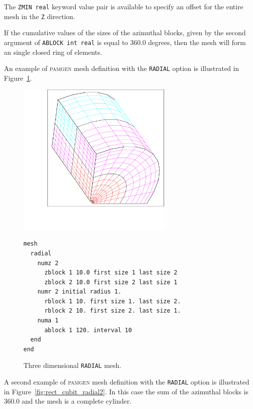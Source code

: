 The \texttt{ZMIN real} keyword value pair is available to specify an offset for the
entire mesh in the \texttt{Z} direction.

If the cumulative values of the sizes of the azimuthal blocks, given
by the second argument of \texttt{ABLOCK int real} is equal to 360.0 degrees, then the mesh
will form an single closed ring of elements.


An example of \textsc{pamgen} mesh definition with the
\texttt{RADIAL} option is illustrated in
Figure~\ref{fig:rect_cubit_radial}.

\begin{figure}[!thbp]
\centering
\hfil
  \begin{minipage}[c]{1.0\linewidth}
    \centering
\includegraphics[width=3.0in]{figures/cubit_radial1}
{\ttfamily \begin{verbatim}
mesh
  radial
    numz 2
      zblock 1 10.0 first size 1 last size 2
      zblock 2 10.0 first size 2 last size 1
    numr 2 initial radius 1.
      rblock 1 10. first size 1. last size 2.
      rblock 2 10. first size 2. last size 1.
    numa 1
      ablock 1 120. interval 10
  end
end
\end{verbatim}}
  \end{minipage}%
  \caption{Three dimensional \texttt{RADIAL} mesh.}
  \label{fig:rect_cubit_radial}
\end{figure}



A second example of \textsc{pamgen} mesh definition with the
\texttt{RADIAL} option is illustrated in
Figure~\ref{fig:rect_cubit_radial2}. In this case the sum of the
azimuthal blocks is 360.0 and the mesh is a
complete cylinder.

